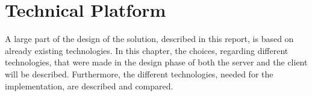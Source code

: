\chapter{Technical Platform}\label{cha:technicalPlatform}

A large part of the design of the solution, described in this report, is based on already existing technologies. 
In this chapter, the choices, regarding different technologies, that were made in the design phase of both the server and the client will be described. Furthermore, the different technologies, needed for the implementation, are described and compared.






